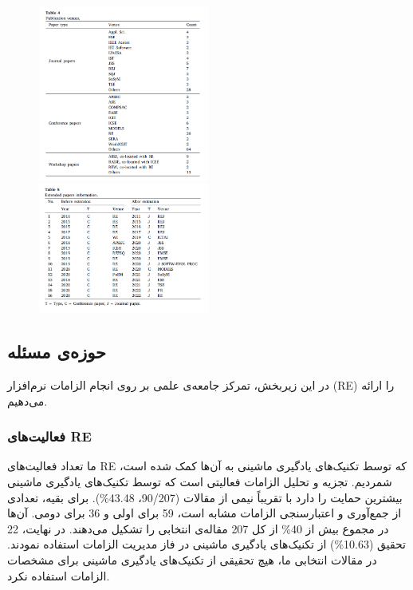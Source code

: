 \documentclass[a4paper,10pt]{article}
\begin{document}
                \begin{figure}
                    \centering
                    \includegraphics[width=0.5\textwidth]{Image/table-4.png}
                    \includegraphics[width=0.5\textwidth]{Image/table-5.png}
                \end{figure}

            \subsection{حوزه‌ی مسئله}

                در این زیربخش، تمرکز جامعه‌ی علمی بر روی انجام الزامات نرم‌افزار (RE) را ارائه می‌دهیم.

            \subsubsection{فعالیت‌های RE}

                ما تعداد فعالیت‌های RE که توسط تکنیک‌های یادگیری ماشینی به آن‌ها کمک شده است، شمردیم. تجزیه و تحلیل الزامات فعالیتی است که توسط تکنیک‌های یادگیری ماشینی بیشترین حمایت را دارد با تقریباً نیمی از مقالات (90/207، 43.48\%). برای بقیه، تعدادی از جمع‌آوری و اعتبارسنجی الزامات مشابه است، 59 برای اولی و 36 برای دومی. آن‌ها در مجموع بیش از 40\% از کل 207 مقاله‌ی انتخابی را تشکیل می‌دهند. در نهایت، 22 تحقیق (10.63\%) از تکنیک‌های یادگیری ماشینی در فاز مدیریت الزامات استفاده نمودند. در مقالات انتخابی ما، هیچ تحقیقی از تکنیک‌های یادگیری ماشینی برای مشخصات الزامات استفاده نکرد.
                    
\end{document}
